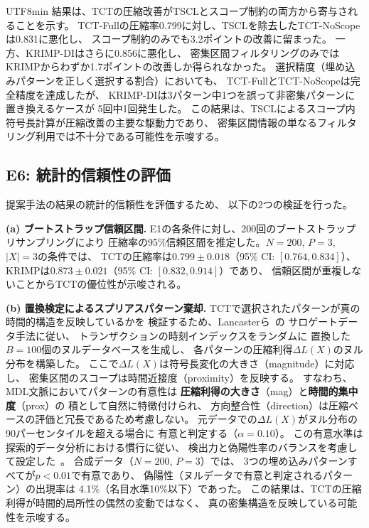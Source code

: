 \documentclass[11pt,a4paper]{article}
\begin{document}
\begin{CJK}{UTF8}{min}
結果は、TCTの圧縮改善がTSCLとスコープ制約の両方から寄与されることを示す。
TCT-Fullの圧縮率0.799に対し、TSCLを除去したTCT-NoScopeは0.831に悪化し、
スコープ制約のみでも3.2ポイントの改善に留まった。
一方、KRIMP-DIはさらに0.856に悪化し、
密集区間フィルタリングのみではKRIMPからわずか1.7ポイントの改善しか得られなかった。
選択精度（埋め込みパターンを正しく選択する割合）においても、
TCT-FullとTCT-NoScopeは完全精度を達成したが、
KRIMP-DIは3パターン中1つを誤って非密集パターンに置き換えるケースが
5回中1回発生した。
この結果は、TSCLによるスコープ内符号長計算が圧縮改善の主要な駆動力であり、
密集区間情報の単なるフィルタリング利用では不十分である可能性を示唆する。

\subsection{E6: 統計的信頼性の評価}\label{sec:e6_significance}

提案手法の結果の統計的信頼性を評価するため、
以下の2つの検証を行った。

\textbf{(a) ブートストラップ信頼区間.}
E1の各条件に対し、200回のブートストラップリサンプリングにより
圧縮率の95\%信頼区間を推定した。$N{=}200$, $P{=}3$, $|X|{=}3$の条件では、
TCTの圧縮率は$0.799 \pm 0.018$（95\% CI: $[0.764, 0.834]$）、
KRIMPは$0.873 \pm 0.021$（95\% CI: $[0.832, 0.914]$）であり、
信頼区間が重複しないことからTCTの優位性が示唆される。

\textbf{(b) 置換検定によるスプリアスパターン棄却.}
TCTで選択されたパターンが真の時間的構造を反映しているかを
検証するため、Lancasterら~\cite{lancaster2018surrogate}の
サロゲートデータ手法に従い、
トランザクションの時刻インデックスをランダムに
置換した$B{=}100$個のヌルデータベースを生成し、
各パターンの圧縮利得$\Delta L(X)$のヌル分布を構築した。
ここで$\Delta L(X)$は符号長変化の大きさ（magnitude）に対応し、
密集区間のスコープは時間近接度（proximity）を反映する。
すなわち、MDL文脈においてパターンの有意性は
\textbf{圧縮利得の大きさ}（mag）と\textbf{時間的集中度}（prox）の
積として自然に特徴付けられ、
方向整合性（direction）は圧縮ベースの評価と冗長であるため考慮しない。
元データでの$\Delta L(X)$がヌル分布の90パーセンタイルを超える場合に
有意と判定する（$\alpha = 0.10$）。
この有意水準は探索的データ分析における慣行に従い、
検出力と偽陽性率のバランスを考慮して設定した~\cite{lancaster2018surrogate}。
合成データ（$N{=}200$, $P{=}3$）では、
3つの埋め込みパターンすべてが$p < 0.01$で有意であり、
偽陽性（ヌルデータで有意と判定されるパターン）の出現率は
4.1\%（名目水準10\%以下）であった。
この結果は、TCTの圧縮利得が時間的局所性の偶然の変動ではなく、
真の密集構造を反映している可能性を示唆する。



\end{CJK}
\end{document}
